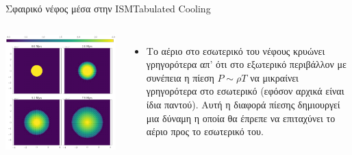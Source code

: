 \documentclass{beamer}
\begin{document}
\begin{frame}{Σφαιρικό νέφος μέσα στην ISM}{Tabulated Cooling}
\begin{columns}
	\begin{center}
		\includegraphics[width=1\linewidth]{../Document/DataImages/TabCoolingRHOquad}
	\end{center}
	\begin{itemize}
		\item{Το αέριο στο εσωτερικό του νέφους κρυώνει γρηγορότερα απ' ότι στο εξωτερικό περιβάλλον με συνέπεια η πίεση $P \sim \rho T$ να μικραίνει γρηγορότερα στο εσωτερικό (εφόσον αρχικά είναι ίδια παντού). Αυτή η διαφορά πίεσης δημιουργεί μια  δύναμη η οποία θα έπρεπε να επιταχύνει το αέριο προς το εσωτερικό του. }
	\end{itemize}
\end{columns}
\end{frame}
\end{document}
